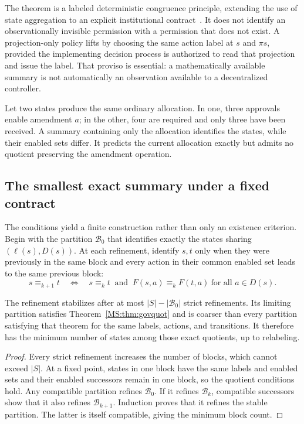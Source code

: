 The theorem is a labeled deterministic congruence principle, extending the use of state aggregation to an explicit institutional contract~\cite{MS:givan}. It does not identify an observationally invisible permission with a permission that does not exist. A projection-only policy lifts by choosing the same action label at $s$ and $\pi s$, provided the implementing decision process is authorized to read that projection and issue the label. That proviso is essential: a mathematically available summary is not automatically an observation available to a decentralized controller.

\begin{MScounterexample}\label{MS:ex:govloss}
Let two states produce the same ordinary allocation. In one, three approvals enable amendment $a$; in the other, four are required and only three have been received. A summary containing only the allocation identifies the states, while their enabled sets differ. It predicts the current allocation exactly but admits no quotient preserving the amendment operation.
\end{MScounterexample}

\subsection{The smallest exact summary under a fixed contract}
The conditions yield a finite construction rather than only an existence criterion. Begin with the partition $\mathcal B_0$ that identifies exactly the states sharing $(\ell(s),D(s))$. At each refinement, identify $s,t$ only when they were previously in the same block and every action in their common enabled set leads to the same previous block:
\[
s\equiv_{k+1}t\quad\Longleftrightarrow\quad
s\equiv_kt\ \text{ and }\ F(s,a)\equiv_kF(t,a)
\ \text{for all }a\in D(s).
\]

\begin{MSproposition}\label{MS:prop:govrefine}
The refinement stabilizes after at most $|S|-|\mathcal B_0|$ strict refinements. Its limiting partition satisfies Theorem~\ref{MS:thm:govquot} and is coarser than every partition satisfying that theorem for the same labels, actions, and transitions. It therefore has the minimum number of states among those exact quotients, up to relabeling.
\end{MSproposition}
\begin{proof}
Every strict refinement increases the number of blocks, which cannot exceed $|S|$. At a fixed point, states in one block have the same labels and enabled sets and their enabled successors remain in one block, so the quotient conditions hold. Any compatible partition refines $\mathcal B_0$. If it refines $\mathcal B_k$, compatible successors show that it also refines $\mathcal B_{k+1}$. Induction proves that it refines the stable partition. The latter is itself compatible, giving the minimum block count.
\end{proof}

